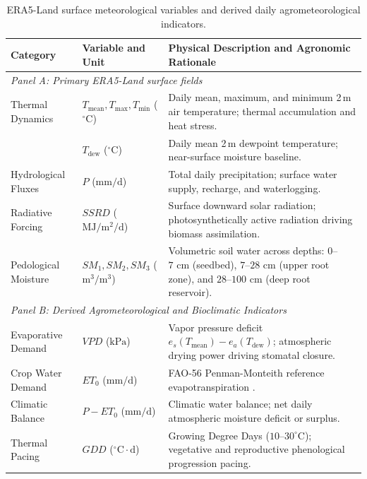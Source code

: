 \begin{table}[htbp]
\centering
\footnotesize
\setlength{\tabcolsep}{5pt}
\renewcommand{\arraystretch}{1.15}
\caption{ERA5-Land surface meteorological variables and derived daily agrometeorological indicators.}
\label{tab:weather_variables}
\begin{tabularx}{\textwidth}{p{3.4cm} p{3.2cm} >{\raggedright\arraybackslash}X}
\toprule
\textbf{Category} & \textbf{Variable and Unit} & \textbf{Physical Description and Agronomic Rationale} \\
\midrule
\multicolumn{3}{l}{\textit{Panel A: Primary ERA5-Land surface fields}} \\
Thermal Dynamics & $T_{\text{mean}}, T_{\text{max}}, T_{\text{min}}$ ($^\circ\text{C}$) & Daily mean, maximum, and minimum 2\,m air temperature; thermal accumulation and heat stress. \\
 & $T_{\text{dew}}$ ($^\circ\text{C}$) & Daily mean 2\,m dewpoint temperature; near-surface moisture baseline. \\
Hydrological Fluxes & $P$ ($\text{mm/d}$) & Total daily precipitation; surface water supply, recharge, and waterlogging. \\
Radiative Forcing & $SSRD$ ($\text{MJ}/\text{m}^2/\text{d}$) & Surface downward solar radiation; photosynthetically active radiation driving biomass assimilation. \\
Pedological Moisture & $SM_1, SM_2, SM_3$ ($\text{m}^3/\text{m}^3$) & Volumetric soil water across depths: $0$--$7\text{ cm}$ (seedbed), $7$--$28\text{ cm}$ (upper root zone), and $28$--$100\text{ cm}$ (deep root reservoir). \\
\midrule
\multicolumn{3}{l}{\textit{Panel B: Derived Agrometeorological and Bioclimatic Indicators}} \\
Evaporative Demand & $VPD$ ($\text{kPa}$) & Vapor pressure deficit $e_s(T_{\text{mean}}) - e_a(T_{\text{dew}})$; atmospheric drying power driving stomatal closure. \\
Crop Water Demand & $ET_0$ ($\text{mm/d}$) & FAO-56 Penman-Monteith reference evapotranspiration \citep{Allen1998}. \\
Climatic Balance & $P - ET_0$ ($\text{mm/d}$) & Climatic water balance; net daily atmospheric moisture deficit or surplus. \\
Thermal Pacing & $GDD$ ($^\circ\text{C}\cdot\text{d}$) & Growing Degree Days ($10$--$30^\circ\text{C}$); vegetative and reproductive phenological progression pacing. \\

\end{tabularx}
\end{table}
